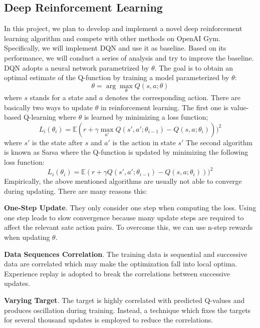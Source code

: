 \subsection{Deep Reinforcement Learning}
In this project, we plan to develop and implement a novel deep reinforcement learning algorithm and compete with other methods on OpenAI Gym. Specifically, we will implement DQN and use it as baseline. Based on its performance, we will conduct a series of analysis and try to improve the baseline.
%
DQN adopts a neural network parametrized by $\theta$. The goal is to obtain an optimal estimate of the Q-function by training a model parameterized by $\theta$:
\begin{equation*}
\theta = \arg\max_\theta Q(s,a;\theta)
\end{equation*}
where $s$ stands for a state and $a$ denotes the corresponding action.
There are basically two ways to update $\theta$ in reinforcement learning. The first one is value-based Q-learning where $\theta$ is learned by minimizing a loss function;
$$
L_{i}(\theta_{i}) = \mathbb{E}(r+\gamma \max_{a'}Q(s',a';\theta_{i-1})-Q(s,a;\theta_{i})))^2 
$$
where $s'$ is the state after $s$ and $a'$ is the action in state $s'$
The second algorithm is known as Sarsa where the Q-function is updated by minimizing the following loss function:
$$
L_{i}(\theta_{i}) = \mathbb{E}(r+\gamma Q(s',a';\theta_{i-1})-Q(s,a;\theta_{i})))^2 
$$
Empirically, the above mentioned algorithms are usually not able to converge during updating. There are many reasons this:

\noindent
\textbf{One-Step Update}. They only consider one step when computing the loss. Using one step leads to slow convergence because many update steps are required to affect the relevant sate action pairs. To overcome this, we can use n-step rewards when updating $\theta$.

\noindent
\textbf{Data Sequences Correlation}. The training data is sequential and successive data are correlated which may make the optimization fall into local optima. Experience replay is adopted to break the correlations between successive updates.

\noindent
\textbf{Varying Target}. The target is highly correlated with predicted Q-values and produces oscillation during training. Instead, a technique which fixes the targets for several thousand updates is employed to reduce the correlations.

